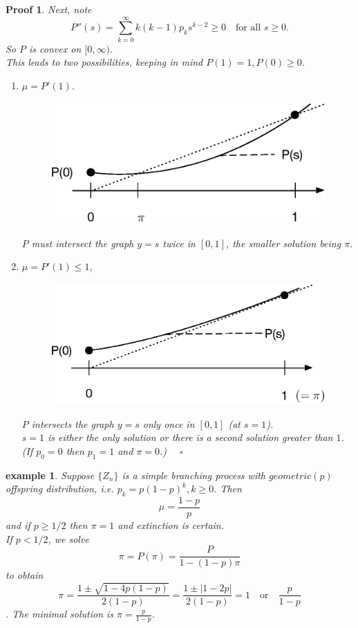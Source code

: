 \documentclass[12pt]{article}
\theoremstyle{definition}
\theoremstyle{plain}
\newtheorem*{myproof}{Proof}
\newtheorem*{example}{example}
\begin{document}
\begin{myproof}
Next, note \[P''(s) = \sum_{k=0}^\infty k(k-1)p_k s^{k-2} \geq 0 \quad \mbox{for all $s \geq 0$.}\]
So $P$ is convex on $[0, \infty)$. \\
This leads to two possibilities, keeping in mind $P(1) = 1, P(0) \geq 0$.
\begin{enumerate}
\item $\mu = P'(1)$.
\begin{figure}[h]
\centering
\includegraphics[scale=.8]{CONVEX1.eps}
\label{1:convex1}
\end{figure}
$P$ must intersect the graph $y=s$ twice in $[0,1]$, the smaller solution being $\pi$.
\item $\mu = P'(1) \leq 1$,
\begin{figure}[h]
\centering
\includegraphics[scale=.8]{CONVEX2.eps}
\label{1:convex2}
\end{figure}
$P$ intersects the graph $y=s$ only once in $[0,1]$ (at $s=1$). \\
$s=1$ is either the only solution or there is a second solution greater than $1$. (If $p_0 = 0$ then $p_1 = 1$ and $\pi = 0$.) $\quad \square$
\end{enumerate}
\end{myproof}
\begin{example}
Suppose $\{Z_n\}$ is a simple branching process with $geometric(p)$ offspring distribution, i.e. $p_k = p(1-p)^k, k \geq 0$. Then \[\mu = \frac{1-p}{p}\] and if $p \geq 1/2$ then $\pi = 1$ and extinction is certain. \\
If $p < 1/2$, we solve \[\pi = P(\pi) = \frac{P}{1 - (1-p)\pi} \] to obtain \[\pi = \frac{1 \pm \sqrt{1 - 4p(1-p)}}{2(1-p)}= \frac{1 \pm |1 -2p|}{2(1-p)} = 1 \quad \mbox{or} \quad \frac{p}{1-p}\]. The minimal solution is $\pi = \frac{p}{1-p}$. 
\end{example}
\end{document}
